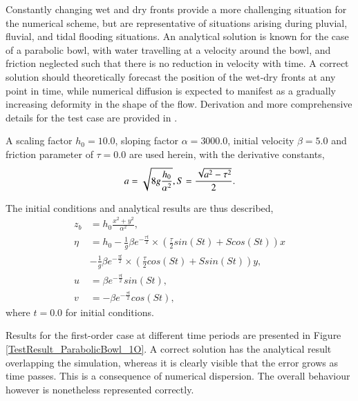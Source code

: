 Constantly changing wet and dry fronts provide a more challenging situation for the numerical scheme, but are representative of situations arising during pluvial, fluvial, and tidal flooding situations. An analytical solution is known for the case of a parabolic bowl, with water travelling at a velocity around the bowl, and friction neglected such that there is no reduction in velocity with time. A correct solution should theoretically forecast the position of the wet-dry fronts at any point in time, while numerical diffusion is expected to manifest as a gradually increasing deformity in the shape of the flow. Derivation and more comprehensive details for the test case are provided in \citet{Wang2011}.

A scaling factor $h_0 = 10.0$, sloping factor $\alpha = 3000.0$, initial velocity $\beta = 5.0$ and friction parameter of $\tau = 0.0$ are used herein, with the derivative constants,
\begin{equation}
\label{Test_ParabolicBowl_Derivatives}
a = \sqrt{8 g \frac{h_0}{\alpha^2}}, \\
S = \frac{\sqrt{a^2 - \tau^2}}{2}
.
\end{equation}

The initial conditions and analytical results are thus described,
\begin{equation}
\label{Test_ParabolicBowl_Conditions}
\begin{alignedat}{2}
z_b & = h_0 \frac{x^2 + y^2}{\alpha^2}, \\
\eta & = h_0 - \frac{1}{g} \beta e^{\displaystyle-\frac{\tau t}{2}} \times \left( \frac{\tau}{2} sin(St) + S cos(St) \right) x \\
& - \frac{1}{g} \beta e^{\displaystyle-\frac{\tau t}{2}} \times \left( \frac{\tau}{2} cos(St) + S sin(St) \right) y, \\
u & = \beta e^{\displaystyle-\frac{\tau t}{2}} sin(St), \\
v & = -\beta e^{\displaystyle-\frac{\tau t}{2}} cos(St),
\end{alignedat}
\end{equation}
where $t = 0.0$ for initial conditions.

Results for the first-order case at different time periods are presented in Figure \ref{TestResult_ParabolicBowl_1O}. A correct solution has the analytical result overlapping the simulation, whereas it is clearly visible that the error grows as time passes. This is a consequence of numerical dispersion. The overall behaviour however is nonetheless represented correctly. 

